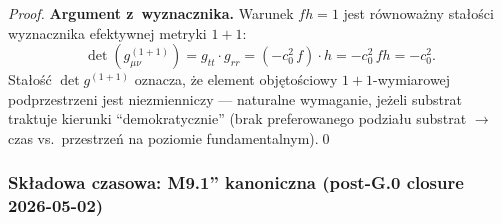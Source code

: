 \begin{proof}
\smallskip\noindent
\textbf{Argument z~wyznacznika.}
Warunek $fh = 1$ jest r\'ownowa\.zny sta\l{}o\'sci
wyznacznika efektywnej metryki $1{+}1$:
\begin{equation}
  \det(g_{\mu\nu}^{(1+1)})
  = g_{tt}\cdot g_{rr}
  = (-c_0^2\, f)\cdot h
  = -c_0^2\,fh = -c_0^2.
\end{equation}
Sta\l{}o\'s\'c $\det g^{(1+1)}$ oznacza, \.ze element
obj\k{e}to\'sciowy $1{+}1$-wymiarowej podprzestrzeni
jest niezmienniczy --- naturalne wymaganie,
je\.zeli substrat traktuje kierunki ``demokratycznie''
(brak preferowanego podzia\l{}u substrat $\to$ czas vs.\ przestrze\'n
na poziomie fundamentalnym).\qed
\end{proof}

\subsubsection{Sk\l{}adowa czasowa: M9.1'' kanoniczna (post-G.0 closure
2026-05-02)}%
\label{sssec:g00-uniqueness}
%
%
%


